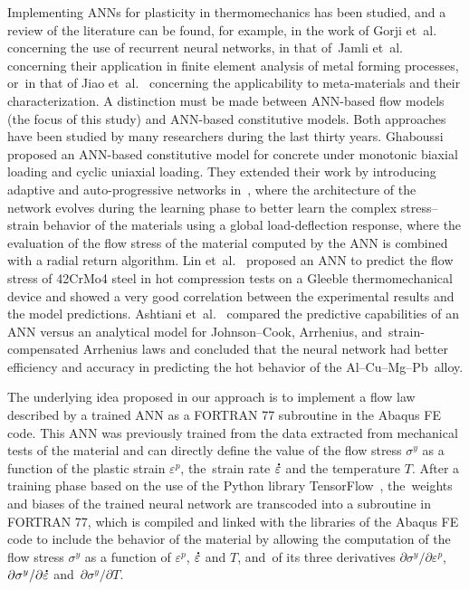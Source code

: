 \documentclass[algorithms,article,accept,pdftex,oneauthors]{Definitions/mdpi}
\DeclareRobustCommand{\mdot}[1]{\accentset{\mbox{\bfseries .}}{#1}}
\begin{document}
Implementing ANNs for plasticity in thermomechanics has been studied, and a review of the literature can be found, for example, in the work of Gorji et~al.~\cite{Gorji-2020} concerning the use of recurrent neural networks, in that of~Jamli et~al.~\cite{Jamli-2019-SNN} concerning their application in finite element analysis of metal forming processes, or~in that of Jiao et~al.~\cite{Jiao-2020} concerning the applicability to meta-materials and their characterization.
A distinction must be made between ANN-based flow models (the focus of this study) and ANN-based constitutive models.
Both approaches have been studied by many researchers during the last thirty years.
Ghaboussi~\cite{Ghaboussi-1991} proposed an ANN-based constitutive model for concrete under monotonic biaxial loading and cyclic uniaxial loading.
They extended their work by introducing adaptive and auto-progressive networks in~\cite{Ghaboussi-1998, Ghaboussi-1998-NNA}, where the architecture of the network evolves during the learning phase to better learn the complex stress--strain behavior of the materials using a global load-deflection response, where the evaluation of the flow stress of the material computed by the ANN is combined with a radial return algorithm.
Lin et~al.~\cite{Lin-2008} proposed an ANN to predict the flow stress of 42CrMo4 steel in hot compression tests on a Gleeble thermomechanical device and showed a very good correlation between the experimental results and the model predictions.
Ashtiani et~al.~\cite{Ashtiani-2016} compared the predictive capabilities of an ANN versus an analytical model for Johnson--Cook, Arrhenius, and~strain-compensated Arrhenius laws and concluded that the neural network had better efficiency and accuracy in predicting the hot behavior of the Al--Cu--Mg--Pb~alloy.

The underlying idea proposed in our approach is to implement a flow law described by a trained ANN as a FORTRAN 77 subroutine in the Abaqus FE code.
This ANN was previously trained from the data extracted from mechanical tests of the material and can directly define the value of the flow stress $\sigma^y$ as a function of the plastic strain $\varepsilon^p$, the~strain rate $\mdot\varepsilon$ and the temperature $T$.
After a training phase based on the use of the Python library TensorFlow~\cite{Abadi-2016, Mattmann-2020}, the~weights and biases of the trained neural network are transcoded into a subroutine in FORTRAN 77, which is compiled and linked with the libraries of the Abaqus FE code to include the behavior of the material by allowing the computation of the flow stress $\sigma^y$ as a function of $\varepsilon^p$, $\mdot\varepsilon$ and $T$, and~of its three derivatives $\partial\sigma^y/\partial\varepsilon^p$, $\partial\sigma^y/\partial\mdot\varepsilon$ and~$\partial\sigma^y/\partial T$.
\end{document}
